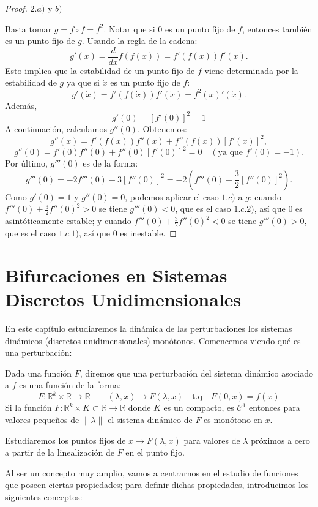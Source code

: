 \documentclass[12pt,a4paper]{report}
\theoremstyle{definition}
\begin{document}
\begin{proof}
$2.a) \text{ y } b)$

Basta tomar $g = f \circ f = f^2$. Notar que si $0$ es un punto fijo de $f$, entonces también es un punto fijo de $g$. Usando la regla de la cadena:
$$
g'(x) = \frac{d}{dx} f(f(x)) = f'(f(x)) f'(x).
$$
%
Esto implica que la estabilidad de un punto fijo de $f$ viene determinada por la estabilidad de $g$ ya que si $\dot{x}$ es un punto fijo de $f$:
$$
g'(\dot{x}) = f'(f(\dot{x})) f'(\dot{x}) = f^{2}(x)'(\dot{x}).
$$
%
Además,
$$
g'(0) = \left[ f'(0) \right]^2 = 1
$$
%
A continuación, calculamos $g''(0)$. Obtenemos:
$$
g''(x) = f'(f(x)) f''(x) + f''(f(x)) \left[ f'(x) \right]^2,
$$
$$
g''(0) = f'(0) f''(0) + f''(0) \left[ f'(0) \right]^2 = 0 \quad (\text{ya que } f'(0) = -1).
$$
%
Por último, $g'''(0)$ es de la forma:
$$
g'''(0) = -2 f'''(0) - 3 \left[ f''(0) \right]^2 = -2\left( f'''(0) + \frac{3}{2} \left[ f''(0) \right]^2 \right).
$$
%
Como $g'(0)=1$ y $g''(0)=0$, podemos aplicar el caso $1.c)$ a $g$: cuando $f'''(0) + \frac{3}{2} f''(0)^2 > 0$ se tiene $g'''(0) < 0$, que es el caso $1.c.2)$, así que $0$ es asintóticamente estable; y cuando $f'''(0) + \frac{3}{2} f''(0)^2 < 0$ se tiene $g'''(0) > 0$, que es el caso $1.c.1)$, así que $0$ es inestable.
\end{proof}
 

\chapter{Bifurcaciones en Sistemas Discretos Unidimensionales}\label{chap:bifurcaciones}

En este capítulo estudiaremos la dinámica de las perturbaciones  los sistemas dinámicos (discretos unidimensionales) monótonos. Comencemos viendo qué es una perturbación:

Dada una función $F$, diremos que una perturbación del sistema dinámico asociado a $f$ es una función de la forma:
$$
F : \mathbb{R}^k \times \mathbb{R} \rightarrow \mathbb{R} \quad  \quad (\lambda,x) \rightarrow F(\lambda,x) \quad \text{t.q}  \quad F(0,x)=f(x)
$$
%
Si la función $F :\mathbb{R}^k \times  K \subset \mathbb{R} \rightarrow \mathbb{R}$ donde $K$ es un compacto, es $\mathcal{C}^1$ entonces para valores pequeños de $\|\lambda\|$ el sistema dinámico de $F$ es monótono en $x$.

Estudiaremos los puntos fijos de $x\to F(\lambda,x)$ para valores de $\lambda$ próximos a cero a partir de la linealización de $F$ en el punto fijo.

Al ser un concepto muy amplio, vamos a centrarnos en el estudio de funciones que poseen ciertas propiedades; para definir dichas propiedades, introducimos los siguientes conceptos:
\end{document}
